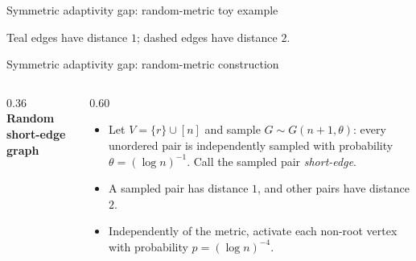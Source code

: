 \documentclass[aspectratio=169,12pt]{beamer}
\begin{document}
\begin{frame}{Symmetric adaptivity gap: random-metric toy example}
  \centering
  {\small\bfseries
    \par}
  \smallskip
  \resizebox{0.86\linewidth}{!}{\ThRandomMetricToy}
  \par\smallskip
  {\small\color{ThTeal}
    \par}

  \medskip
   Teal edges have distance \(1\); dashed edges have distance \(2\). 
\end{frame}

\begin{frame}{Symmetric adaptivity gap: random-metric construction}
  \begin{columns}[c,onlytextwidth]
    \begin{column}{0.36\textwidth}
      \centering
      \textbf{Random short-edge graph}\par
      \resizebox{0.78\linewidth}{!}{\ThRandomMetric}
    \end{column}
    \begin{column}{0.60\textwidth}
      \begin{itemize}\setlength{\itemsep}{0.48em}
        \item Let \(V=\{r\}\cup[n]\) and sample
          \(G\sim G(n+1,\theta)\): every unordered pair is independently sampled
          with probability \(\theta=(\log n)^{-1}\). Call the sampled pair \emph{short-edge}.
        \item A sampled pair has distance \(1\), and other pairs have
          distance \(2\). 
        \item Independently of the metric, activate each non-root vertex
          with probability \(p=(\log n)^{-4}\).
      \end{itemize}
    \end{column}
  \end{columns}

\end{frame}
\end{document}
